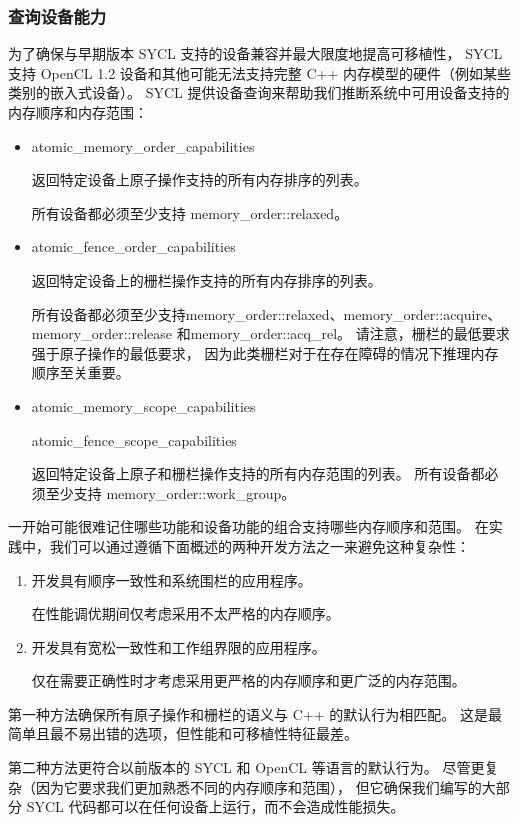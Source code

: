 \subsubsection{查询设备能力}
为了确保与早期版本 SYCL 支持的设备兼容并最大限度地提高可移植性，
SYCL 支持 OpenCL 1.2 设备和其他可能无法支持完整 C++ 内存模型的硬件（例如某些类别的嵌入式设备）。 
SYCL 提供设备查询来帮助我们推断系统中可用设备支持的内存顺序和内存范围：

\begin{itemize}
	\item atomic\_memory\_order\_capabilities

	返回特定设备上原子操作支持的所有内存排序的列表。

	所有设备都必须至少支持 memory\_order::relaxed。

	\item atomic\_fence\_order\_capabilities

	返回特定设备上的栅栏操作支持的所有内存排序的列表。

	所有设备都必须至少支持memory\_order::relaxed、memory\_order::acquire、memory\_order::release 
	和memory\_order::acq\_rel。 请注意，栅栏的最低要求强于原子操作的最低要求，
	因为此类栅栏对于在存在障碍的情况下推理内存顺序至关重要。

	\item atomic\_memory\_scope\_capabilities

	atomic\_fence\_scope\_capabilities

	返回特定设备上原子和栅栏操作支持的所有内存范围的列表。 所有设备都必须至少支持 memory\_order::work\_group。
\end{itemize}

一开始可能很难记住哪些功能和设备功能的组合支持哪些内存顺序和范围。 
在实践中，我们可以通过遵循下面概述的两种开发方法之一来避免这种复杂性：
\begin{enumerate}
	\item 开发具有顺序一致性和系统围栏的应用程序。

	在性能调优期间仅考虑采用不太严格的内存顺序。

	\item 开发具有宽松一致性和工作组界限的应用程序。

	仅在需要正确性时才考虑采用更严格的内存顺序和更广泛的内存范围。
\end{enumerate}

第一种方法确保所有原子操作和栅栏的语义与 C++ 的默认行为相匹配。 
这是最简单且最不易出错的选项，但性能和可移植性特征最差。

第二种方法更符合以前版本的 SYCL 和 OpenCL 等语言的默认行为。 
尽管更复杂（因为它要求我们更加熟悉不同的内存顺序和范围），
但它确保我们编写的大部分 SYCL 代码都可以在任何设备上运行，而不会造成性能损失。

